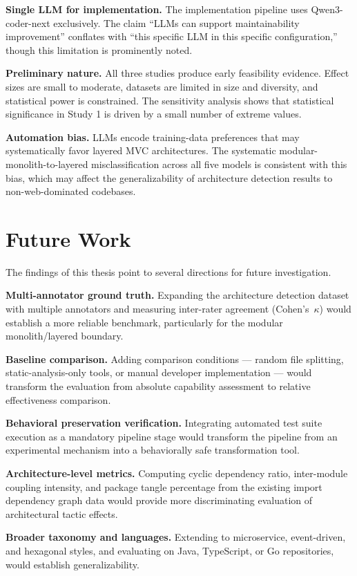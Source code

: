 \textbf{Single LLM for implementation.} The implementation pipeline uses Qwen3-coder-next exclusively. The claim ``LLMs can support maintainability improvement'' conflates with ``this specific LLM in this specific configuration,'' though this limitation is prominently noted.

\textbf{Preliminary nature.} All three studies produce early feasibility evidence. Effect sizes are small to moderate, datasets are limited in size and diversity, and statistical power is constrained. The sensitivity analysis shows that statistical significance in Study 1 is driven by a small number of extreme values.

\textbf{Automation bias.} LLMs encode training-data preferences that may systematically favor layered MVC architectures. The systematic modular-monolith-to-layered misclassification across all five models is consistent with this bias, which may affect the generalizability of architecture detection results to non-web-dominated codebases.

\section{Future Work}

The findings of this thesis point to several directions for future investigation.

\textbf{Multi-annotator ground truth.} Expanding the architecture detection dataset with multiple annotators and measuring inter-rater agreement (Cohen's~$\kappa$) would establish a more reliable benchmark, particularly for the modular monolith/layered boundary.

\textbf{Baseline comparison.} Adding comparison conditions — random file splitting, static-analysis-only tools, or manual developer implementation — would transform the evaluation from absolute capability assessment to relative effectiveness comparison.

\textbf{Behavioral preservation verification.} Integrating automated test suite execution as a mandatory pipeline stage would transform the pipeline from an experimental mechanism into a behaviorally safe transformation tool.

\textbf{Architecture-level metrics.} Computing cyclic dependency ratio, inter-module coupling intensity, and package tangle percentage from the existing import dependency graph data would provide more discriminating evaluation of architectural tactic effects.

\textbf{Broader taxonomy and languages.} Extending to microservice, event-driven, and hexagonal styles, and evaluating on Java, TypeScript, or Go repositories, would establish generalizability.


